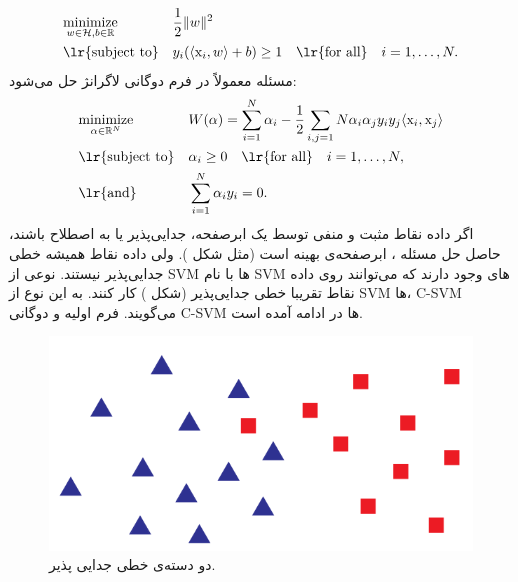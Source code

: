 \begin{equation}\label{eq:svm-normal-form}
\begin{aligned}
& \underset{w \in \mH, b \in \R}{\text{minimize}} & & \dfrac{1}{2} \|w\|^2 \\
& \text{\lr{subject to}} & & y_i(\langle \mx_i,w \rangle + b) \geq 1 \quad\text{\lr{for all}}\quad i = 1, \ldots ,N.
\end{aligned}
\end{equation}
مسئله  معمولاً در فرم دوگانی لاگرانژ حل می‌شود:
\begin{equation}\label{eq:svm-dual-form}
\begin{aligned}
& \underset{\alpha \in \R^N}{\text{minimize}} & & W(\alpha)=\sum_{i=1}^{N}\alpha_i - \dfrac{1}{2} \sum_{i,j=1}{N} \alpha_i \alpha_j y_i y_j \langle \mx_i,\mx_j \rangle \\
& \text{\lr{subject to}} & & \alpha_i \geq 0 \quad\text{\lr{for all}}\quad i = 1, \ldots ,N, \\
& \text{\lr{and}} & & \sum_{i=1}^{N} \alpha_i y_i = 0.
\end{aligned}
\end{equation}
اگر داده نقاط مثبت و منفی توسط یک ابرصفحه، جدایی‌پذیر یا به اصطلاح  باشند، حاصل حل مسئله ، ابرصفحه‌ی بهینه است (مثل شکل ). ولی داده نقاط همیشه خطی جدایی‌پذیر نیستند. نوعی از SVM ها با نام SVM‌ های  وجود دارند که می‌توانند روی داده نقاط تقریبا خطی جدایی‌پذیر (شکل ) کار کنند. به این نوع از SVM ها، C-SVM می‌گویند. فرم اولیه و دوگانی C-SVM ها در ادامه آمده است.

\begin{figure}[ht]
\centering
\includegraphics[scale=0.3]{./almost-linearly-separable.png}
\caption{دو دسته‌ی  خطی جدایی پذیر.}
\label{fig:almost-linearly-separable}
\end{figure}

